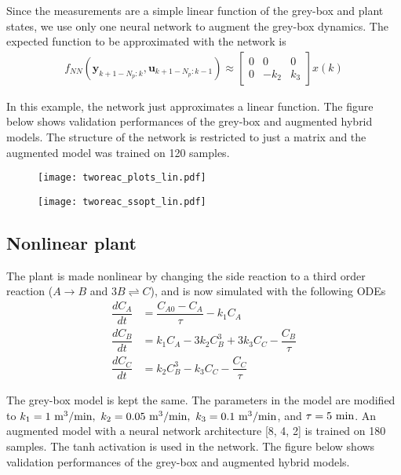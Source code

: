 \documentclass{article}
\begin{document}
Since the measurements are a simple linear function 
of the grey-box and plant states, we use only one 
neural network to 
augment the grey-box dynamics. 
The expected function 
to be approximated with the network is
\begin{align*}
  f_{NN}(\mathbf{y}_{k+1-N_p:k}, \mathbf{u}_{k+1-N_p:k-1}) \approx 
  \begin{bmatrix}
  0 & 0 & 0 \\  
  0 & -k_2 & k_3 
  \end{bmatrix}x(k)
\end{align*}

In this example, the network just approximates a linear function.
The figure below shows validation performances of the grey-box 
and augmented hybrid models. The structure 
of the network is restricted to just a matrix and
the augmented model was trained on 120 samples.

\begin{figure}[!h]
  \centering
  \texttt{[image: tworeac\_plots\_lin.pdf]}
\end{figure}

\begin{figure}[!h]
  \centering
  \texttt{[image: tworeac\_ssopt\_lin.pdf]}
\end{figure}

\subsection{Nonlinear plant}
The plant is made nonlinear by changing the side reaction 
to a third order reaction ($A \rightarrow B $ and  $3B \rightleftharpoons C$),
and is now simulated with the following ODEs
\begin{align*}
  \dfrac{dC_A}{dt} &= \dfrac{C_{A0} - C_A}{\tau} - k_1C_A\\
  \dfrac{dC_B}{dt} &= k_1C_A - 3k_2C^3_B + 3k_3C_C- \dfrac{C_B}{\tau}\\
  \dfrac{dC_C}{dt} &= k_2C^3_B - k_3C_C - \dfrac{C_C}{\tau}
\end{align*}

The grey-box model is kept the same. The parameters 
in the model are modified to 
$k_1 = 1 \ \textnormal{m}^3/\textnormal{min}, 
\ k_2 = 0.05 \ \textnormal{m}^3/\textnormal{min},
\ k_3 = 0.1 \ \textnormal{m}^3/\textnormal{min}$, 
and $\tau = 5 \ \textnormal{min}$.
An augmented model with a neural
network architecture [8, 4, 2] is trained on 180 samples. The 
tanh activation is used in the network. The figure below shows 
validation performances of the grey-box and augmented 
hybrid models.
\end{document}
